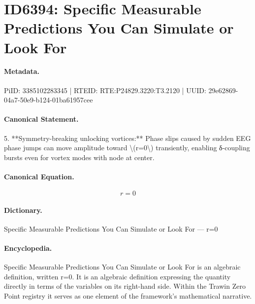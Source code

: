 \section*{ID6394: Specific Measurable Predictions You Can Simulate or Look For}
\paragraph{Metadata.}
PiID: 3385102283345 | RTEID: RTE:P24829.3220:T3.2120 | UUID: 29e62869-04a7-50e9-b124-01ba61957cee

\paragraph{Canonical Statement.}
5. **Symmetry-breaking unlocking vortices:** Phase slips caused by sudden EEG phase jumps can move amplitude toward \textbackslash{}(r=0\textbackslash{}) transiently, enabling δ-coupling bursts even for vortex modes with node at center.

\paragraph{Canonical Equation.}
\[
r=0
\]

\paragraph{Dictionary.}
Specific Measurable Predictions You Can Simulate or Look For — r=0

\paragraph{Encyclopedia.}
Specific Measurable Predictions You Can Simulate or Look For is an algebraic definition, written r=0. It is an algebraic definition expressing the quantity directly in terms of the variables on its right-hand side. Within the Trawin Zero Point registry it serves as one element of the framework's mathematical narrative.
